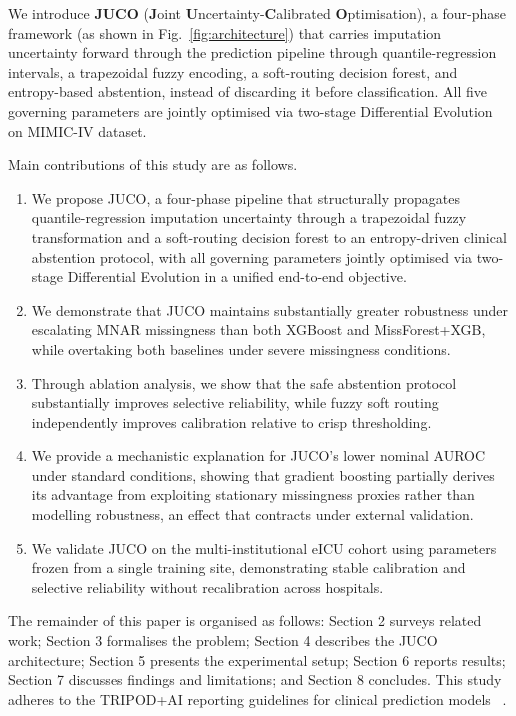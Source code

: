\documentclass[journal]{IEEEtran}
\begin{document}
	We introduce \textbf{JUCO} (\textbf{J}oint \textbf{U}ncertainty-\textbf{C}alibrated \textbf{O}ptimisation), a four-phase framework (as shown in Fig.~\ref{fig:architecture}) that carries imputation uncertainty forward through the prediction pipeline through quantile-regression intervals, a trapezoidal fuzzy encoding, a soft-routing decision forest, and entropy-based abstention, instead of discarding it before classification. All five governing parameters are jointly optimised via two-stage Differential Evolution on MIMIC-IV dataset.
	
	Main contributions of this study are as follows.
	
	\begin{enumerate}
		\item We propose JUCO, a four-phase pipeline that
		structurally propagates quantile-regression imputation
		uncertainty through a trapezoidal fuzzy transformation
		and a soft-routing decision forest to an entropy-driven
		clinical abstention protocol, with all governing
		parameters jointly optimised via two-stage Differential
		Evolution in a unified end-to-end objective.
		
		\item We demonstrate that JUCO maintains substantially
		greater robustness under escalating MNAR missingness
		than both XGBoost and MissForest+XGB, while overtaking
		both baselines under severe missingness conditions.
		
		\item Through ablation analysis, we show that the safe
		abstention protocol substantially improves selective
		reliability, while fuzzy soft routing independently
		improves calibration relative to crisp thresholding.
		
		\item We provide a mechanistic explanation for JUCO's
		lower nominal AUROC under standard conditions, showing
		that gradient boosting partially derives its advantage
		from exploiting stationary missingness proxies rather
		than modelling robustness, an effect that contracts
		under external validation.
		
		\item We validate JUCO on the multi-institutional eICU
		cohort using parameters frozen from a single training
		site, demonstrating stable calibration and selective
		reliability without recalibration across hospitals.
	\end{enumerate}
	
	The remainder of this paper is organised as follows: Section 2 surveys related work; Section 3 formalises the problem; Section 4 describes the JUCO architecture; Section 5 presents the experimental setup; Section 6 reports results; Section 7 discusses findings and limitations; and Section 8 concludes. This study adheres to the TRIPOD+AI reporting guidelines for clinical prediction models ~\cite{collins2024tripodai}.
	
\end{document}
